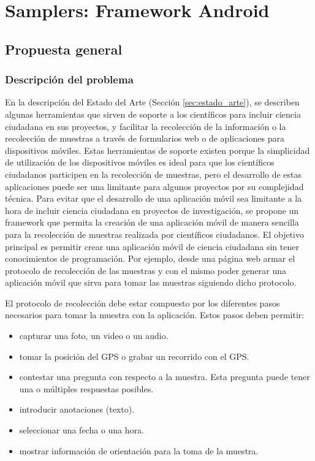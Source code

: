 \chapter{Samplers: Framework Android} \label{cap:samplers}

\section{Propuesta general}

\subsection{Descripción del problema}
En la descripción del Estado del Arte (Sección \ref{sec:estado_arte}), se describen algunas herramientas que sirven de soporte a los científicos para incluir ciencia ciudadana en sus proyectos, y facilitar la recolección de la información o la recolección de muestras a través de formularios web o de aplicaciones para dispositivos móviles. Estas herramientas de soporte existen porque la simplicidad de utilización de los dispositivos móviles es ideal para que los científicos ciudadanos participen en la recolección de muestras, pero el desarrollo de estas aplicaciones puede ser una limitante para algunos proyectos por su complejidad técnica. \cite{kim2013sensr}
Para evitar que el desarrollo de una aplicación móvil sea limitante a la hora de incluir ciencia ciudadana en proyectos de investigación, se propone un framework que permita la creación de una aplicación móvil de manera sencilla para la recolección de muestras realizada por científicos ciudadanos.
El objetivo principal es permitir crear una aplicación móvil de ciencia ciudadana sin tener conocimientos de programación. Por ejemplo, desde una página web armar el protocolo de recolección de las muestras y con el mismo poder generar una aplicación móvil que sirva para tomar las muestras siguiendo dicho protocolo.

El protocolo de recolección debe estar compuesto por los diferentes pasos necesarios para tomar la muestra con la aplicación. Estos pasos deben permitir:
\begin{itemize}
\item capturar una foto, un video o un audio.
\item tomar la posición del GPS o grabar un recorrido con el GPS.
\item contestar una pregunta con respecto a la muestra. Esta pregunta puede tener una o múltiples respuestas posibles.
\item introducir anotaciones (texto).
\item seleccionar una fecha o una hora.
\item mostrar información de orientación para la toma de la muestra.
\end{itemize}

